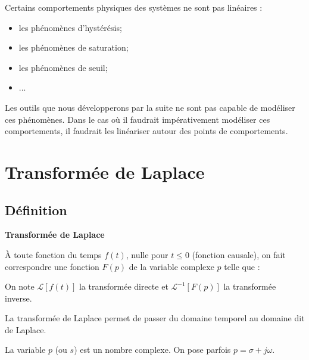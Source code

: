 \documentclass[10pt,fleqn]{article} %
\begin{document}
Certains comportements physiques des systèmes ne sont pas linéaires :
\begin{itemize}
\item les phénomènes d'hystérésis;
\item les phénomènes de saturation;
\item les phénomènes de seuil;
\item ...
\end{itemize}

Les outils que nous développerons par la suite ne sont pas capable de modéliser ces phénomènes. Dans le cas où il faudrait impérativement modéliser ces comportements, il faudrait les linéariser autour des points de comportements.



\section{Transformée de Laplace}
\subsection{Définition}
\begin{defi}
\textbf{Transformée de Laplace}

À toute fonction du temps $f(t)$, nulle pour $t\leq0$ (fonction causale), on fait correspondre une fonction $F(p)$ de la variable complexe $p$ telle que :


On note $\mathcal{L}\left[f(t)\right]$ la transformée directe et $\mathcal{L}^{-1}\left[F(p)\right]$ la transformée inverse.
\end{defi}

La transformée de Laplace permet de passer du domaine temporel au domaine dit de Laplace.

La variable $p$ (ou $s$) est un nombre complexe. On pose parfois $p=\sigma + j\omega$.
\end{document}
